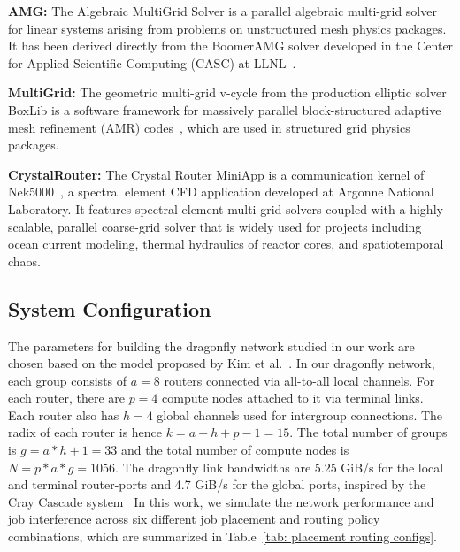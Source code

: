 \textbf{AMG:} The Algebraic MultiGrid Solver is a parallel algebraic multi-grid solver for linear systems arising from problems on unstructured mesh physics packages. It has been derived directly from the BoomerAMG solver developed in the Center for Applied Scientific Computing (CASC) at LLNL~\cite{amg}. 


\textbf{MultiGrid:} The geometric multi-grid v-cycle from the production elliptic solver BoxLib is a software framework for massively parallel block-structured adaptive mesh refinement (AMR) codes~\cite{boxlib}, which are used in structured grid physics packages. 

\textbf{CrystalRouter:} The Crystal Router MiniApp is a communication kernel of Nek5000~\cite{nek5000}, a spectral element CFD application developed at Argonne National Laboratory. It features spectral element multi-grid solvers coupled with a highly scalable, parallel coarse-grid solver that is widely used for projects including ocean current modeling, thermal hydraulics of reactor cores, and spatiotemporal chaos. 




\subsection{System Configuration}
\label{sec: simulation configuration}

The parameters for building the dragonfly network studied in our work are chosen based on the model proposed by Kim et al.~\cite{kim-micro}. 
In our dragonfly network, each group consists of $a = 8$ routers connected via all-to-all local channels. For each router, there are $p = 4$ compute nodes attached to it via terminal links. Each router also has $h = 4$ global channels used for intergroup connections. The radix of each router is hence $k = a+h+p-1 = 15$. 
The total number of groups is $g = a*h+1 = 33 $ and the total number of compute nodes is $N = p*a*g = 1056$. 
The dragonfly link bandwidths are 5.25 GiB/s for the local and terminal router-ports and 4.7 GiB/s for the global ports, inspired by the Cray Cascade system~\cite{faanes} 
In this work, we simulate the network performance and job interference across six different job placement and routing policy combinations, which are summarized in Table~\ref{tab: placement routing configs}.


